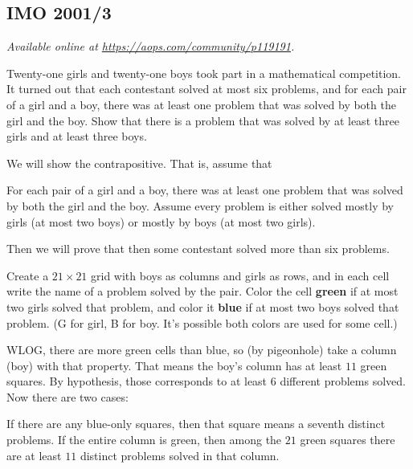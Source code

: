 \documentclass[11pt]{scrartcl}
\begin{document}
\subsection{IMO 2001/3}
\textsl{Available online at \url{https://aops.com/community/p119191}.}
\begin{mdframed}[style=mdpurplebox,frametitle={Problem statement}]
Twenty-one girls and twenty-one boys
took part in a mathematical competition.
It turned out that each contestant solved at most six problems,
and for each pair of a girl and a boy,
there was at least one problem that was
solved by both the girl and the boy.
Show that there is a problem that was solved by
at least three girls and at least three boys.
\end{mdframed}
We will show the contrapositive.
That is, assume that
\begin{itemize}
  \ii For each pair of a girl and a boy,
  there was at least one problem that was
  solved by both the girl and the boy.
  \ii Assume every problem is either solved
  mostly by girls (at most two boys)
  or mostly by boys (at most two girls).
\end{itemize}
Then we will prove that then some contestant
solved more than six problems.

Create a $21 \times 21$ grid with boys as columns
and girls as rows, and in each cell
write the name of a problem solved by the pair.
Color the cell \textbf{green} if at most two girls solved that problem,
and color it \textbf{blue} if at most two boys solved that problem.
(G for girl, B for boy.
It's possible both colors are used for some cell.)

WLOG, there are more green cells than blue,
so (by pigeonhole) take a column (boy) with that property.
That means the boy's column has at least $11$ green squares.
By hypothesis, those corresponds to at least $6$ different problems
solved. Now there are two cases:
\begin{itemize}
  \ii If there are any blue-only squares,
  then that square means a seventh distinct problems.
  \ii If the entire column is green,
  then among the $21$ green squares
  there are at least $11$ distinct problems solved
  in that column.
\end{itemize}
\end{document}
